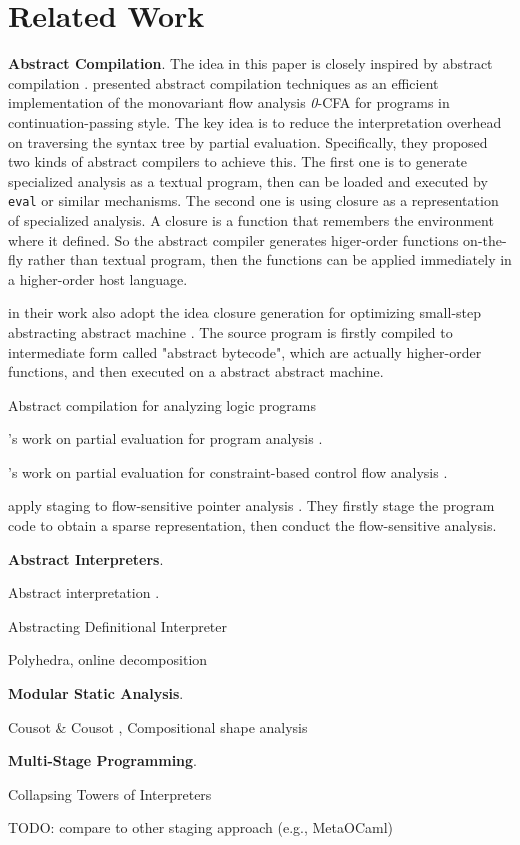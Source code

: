\section{Related Work}

\textbf{Abstract Compilation}. The idea in this paper is closely inspired by 
abstract compilation \cite{Boucher:1996:ACN:647473.727587}.
\citeauthor{Boucher:1996:ACN:647473.727587} presented abstract compilation
techniques as an efficient implementation of the monovariant flow analysis 
\textit{0}-CFA for programs in continuation-passing style. The key idea is to 
reduce the interpretation overhead on traversing the syntax tree by partial evaluation.
Specifically, they proposed two kinds of abstract compilers to achieve this. 
The first one is to generate specialized analysis as a textual program, then 
can be loaded and executed by \texttt{eval} or similar mechanisms. The second 
one is using closure as a representation of specialized analysis. 
A closure is a function that remembers the environment where it defined. So the 
abstract compiler generates higer-order functions on-the-fly rather than textual 
program, then the functions can be applied immediately in a higher-order host language.

\citeauthor{Johnson:2013:OAA:2500365.2500604} in their work also adopt the 
idea closure generation for optimizing small-step abstracting abstract machine
\cite{Johnson:2013:OAA:2500365.2500604}. The source program is firstly compiled
to intermediate form called "abstract bytecode", which are actually higher-order functions, 
and then executed on a abstract abstract machine.

Abstract compilation for analyzing logic programs\cite{DBLP:conf/flops/AmatoS01}

\citeauthor{damian1999partial}'s work on partial evaluation for program analysis \cite{damian1999partial}.

\citeauthor{amtoft1999partial}'s work on partial evaluation for constraint-based 
control flow analysis \cite{amtoft1999partial}.

\citeauthor{hardekopf2011flow} apply staging to flow-sensitive pointer analysis \cite{hardekopf2011flow}. 
They firstly stage the program code to obtain a sparse representation, then conduct
the flow-sensitive analysis. 

\textbf{Abstract Interpreters}. 

Abstract interpretation \cite{DBLP:conf/popl/CousotC77}.

Abstracting Definitional Interpreter \cite{darais2017abstracting}

Polyhedra, online decomposition

\textbf{Modular Static Analysis}. 

Cousot \& Cousot \cite{DBLP:conf/cc/CousotC02}, 
Compositional shape analysis \cite{DBLP:conf/popl/CalcagnoDOY09}

\textbf{Multi-Stage Programming}.

Collapsing Towers of Interpreters\cite{Amin:2017:CTI:3177123.3158140}

TODO: compare to other staging approach (e.g., MetaOCaml)
